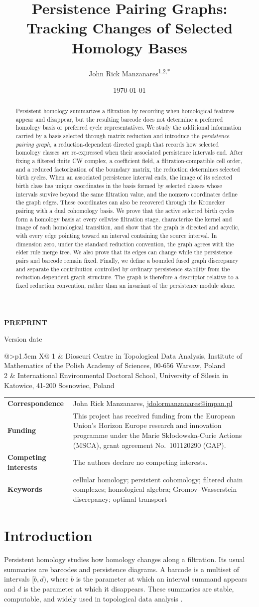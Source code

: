 \documentclass[11pt]{article}
\title{Persistence Pairing Graphs: Tracking Changes of Selected Homology Bases}
\author{John Rick Manzanares\textsuperscript{1,2,*}}
\date{\today}
\makeatletter
\theoremstyle{paperdefinition}
\theoremstyle{paperplain}
\theoremstyle{paperremark}
\newcommand{\papertype}{Preprint}
\newcommand{\affiliations}{%
\begin{tabularx}{\linewidth}{@{}>{\raggedleft\arraybackslash\sffamily\bfseries\color{PaperTeal}}p{1.5em} X@{}}
1 & Dioscuri Centre in Topological Data Analysis, Institute of Mathematics of the Polish Academy of Sciences, 00-656 Warsaw, Poland\\[0.2em]
2 & International Environmental Doctoral School, University of Silesia in Katowice, 41-200 Sosnowiec, Poland
\end{tabularx}}
\newcommand{\correspondence}{%
John Rick Manzanares, \href{mailto:jdolormanzanares@impan.pl}{jdolormanzanares@impan.pl}}
\newcommand{\funding}{%
This project has received funding from the European Union's Horizon Europe research and innovation programme under the Marie Skłodowska-Curie Actions (MSCA), grant agreement No.~101120290 (GAP).}
\newcommand{\competinginterests}{The authors declare no competing interests.}
\newcommand{\keywords}{cellular homology; persistent cohomology; filtered chain complexes; homological algebra; Gromov--Wasserstein discrepancy; optimal transport}
\renewcommand{\maketitle}{%
  \thispagestyle{empty}
  \noindent
  \begin{minipage}[t]{0.69\textwidth}
    {\sffamily\footnotesize\bfseries\color{PaperTeal}\MakeUppercase{\papertype}}\\[0.75em]
    {\fontsize{23}{27}\selectfont\sffamily\bfseries\color{PaperNavy}\@title\par}
    \vspace{0.85em}
    {\large\sffamily\color{PaperInk}\@author\par}
  \end{minipage}%
  \hfill
  \begin{minipage}[t]{0.24\textwidth}
    \raggedleft
    {\sffamily\footnotesize\color{PaperMuted}Version date\\[0.2em]
    \color{PaperInk}\@date}
  \end{minipage}

  \vspace{1.0em}
  \noindent{\color{PaperTeal}\rule{\textwidth}{1.15pt}}
  \vspace{0.95em}

  {\small\noindent\affiliations\par}
  \vspace{0.75em}

  \noindent\begin{tcolorbox}[
    enhanced,colback=PaperWash,colframe=PaperLine,boxrule=0.4pt,
    arc=1.2pt,left=10pt,right=10pt,top=8pt,bottom=8pt]
  \noindent\begin{tabularx}{\linewidth}{@{}>{\sffamily\bfseries\color{PaperNavy}}p{3.3cm} X@{}}
  Correspondence & \correspondence\\[0.32em]
  Funding & \funding\\[0.32em]
  Competing interests & \competinginterests\\[0.32em]
  Keywords & \keywords
  \end{tabularx}
  \end{tcolorbox}
  \vspace{0.35em}
}
\makeatother
\begin{document}
\maketitle

\begin{abstract}
\noindent
Persistent homology summarizes a filtration by recording when homological features appear and disappear, but the resulting barcode does not determine a preferred homology basis or preferred cycle representatives. We study the additional information carried by a basis selected through matrix reduction and introduce the \emph{persistence pairing graph}, a reduction-dependent directed graph that records how selected homology classes are re-expressed when their associated persistence intervals end. After fixing a filtered finite CW complex, a coefficient field, a filtration-compatible cell order, and a reduced factorization of the boundary matrix, the reduction determines selected birth cycles. When an associated persistence interval ends, the image of its selected birth class has unique coordinates in the basis formed by selected classes whose intervals survive beyond the same filtration value, and the nonzero coordinates define the graph edges. These coordinates can also be recovered through the Kronecker pairing with a dual cohomology basis. We prove that the active selected birth cycles form a homology basis at every cellwise filtration stage, characterize the kernel and image of each homological transition, and show that the graph is directed and acyclic, with every edge pointing toward an interval containing the source interval. In dimension zero, under the standard reduction convention, the graph agrees with the elder rule merge tree. We also prove that its edges can change while the persistence pairs and barcode remain fixed. Finally, we define a bounded fused graph discrepancy and separate the contribution controlled by ordinary persistence stability from the reduction-dependent graph structure. The graph is therefore a descriptor relative to a fixed reduction convention, rather than an invariant of the persistence module alone.
\end{abstract}

\section{Introduction}

Persistent homology studies how homology changes along a filtration. Its usual summaries are barcodes and persistence diagrams. A barcode is a multiset of intervals $[b,d)$, where $b$ is the parameter at which an interval summand appears and $d$ is the parameter at which it disappears. These summaries are stable, computable, and widely used in topological data analysis \cite{edelsbrunner2002topological,zomorodian2005computing, ghrist2008barcodes,edelsbrunnerharer2010computational}.
\end{document}
